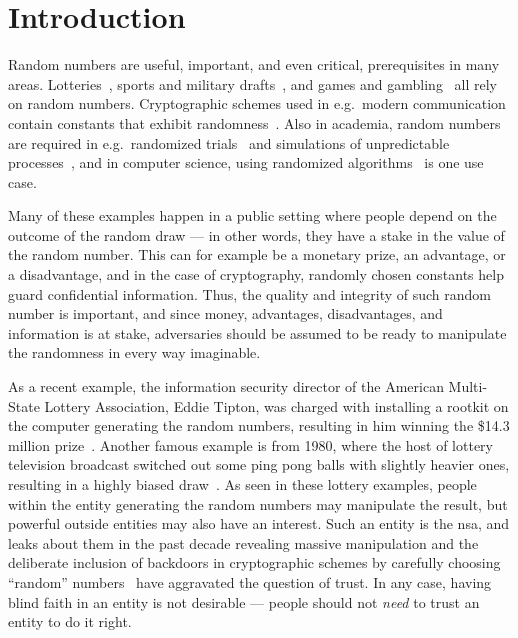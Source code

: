 \section{Introduction}\label{cha:introduction}

Random numbers are useful, important, and even critical, prerequisites in many areas.
Lotteries~\cite{grumbach2017distributed}, sports and military drafts~\cite{nbalottery, starr1997nonrandom}, and games and gambling~\cite{randomnumbersgames} all rely on random numbers.
Cryptographic schemes used in e.g.\ modern communication contain constants that exhibit randomness~\cite{baigneres2015trap}.
Also in academia, random numbers are required in e.g.\ randomized trials~\cite{kim2014random} and simulations of unpredictable processes~\cite{heath2002scientific}, and in computer science, using randomized algorithms~\cite[Section~5.3]{cormen2009introduction} is one use case.

Many of these examples happen in a public setting where people depend on the outcome of the random draw --- in other words, they have a stake in the value of the random number.
This can for example be a monetary prize, an advantage, or a disadvantage, and in the case of cryptography, randomly chosen constants help guard confidential information.
Thus, the quality and integrity of such random number is important, and since money, advantages, disadvantages, and information is at stake, adversaries should be assumed to be ready to manipulate the randomness in every way imaginable.

As a recent example, the information security director of the American Multi-State Lottery Association, Eddie Tipton, was charged with installing a rootkit on the computer generating the random numbers, resulting in him winning the \$14.3 million prize~\cite{lotteryscandal-eddietipton}.
Another famous example is from 1980, where the host of lottery television broadcast switched out some ping pong balls with slightly heavier ones, resulting in a highly biased draw~\cite{lotteryscandal-666}.
As seen in these lottery examples, people within the entity generating the random numbers may manipulate the result, but powerful outside entities may also have an interest.
Such an entity is the \gls{nsa}, and leaks about them in the past decade revealing massive manipulation and the deliberate inclusion of backdoors in cryptographic schemes by carefully choosing \enquote{random} numbers~\cite{nytimes-nsaconstants,nytimes-nsabackdoors} have aggravated the question of trust.
In any case, having blind faith in an entity is not desirable --- people should not \emph{need} to trust an entity to do it right.

